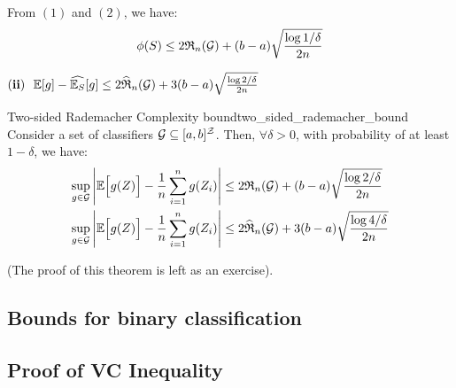 \begin{proof*}
    \noindent From $(1)$ and $(2)$, we have:
    \begin{align*}
        \phi(S) \le 2\mathfrak{R}_n(\mathcal{G}) + (b-a)\sqrt{
            \frac{\log 1/\delta}{2n}
        }
    \end{align*}

    \begin{subproof}{\newline ${\bf (ii)} \ \ \mathbb{E}[g] - \widehat{\mathbb{E}_S}[g] \le 2\widehat{\mathfrak{R}}_n(\mathcal{G}) + 3(b-a)\sqrt{\frac{\log2/\delta}{2n}}$}
        
    \end{subproof}
\end{proof*}

\begin{theorem}{Two-sided Rademacher Complexity bound}{two_sided_rademacher_bound}
    Consider a set of classifiers $\mathcal{G}\subseteq[a,b]^\mathcal{Z}$. Then, $\forall \delta>0$, with probability of at least $1-\delta$, we have:
    \begin{align*}
        \sup_{g\in\mathcal{G}}\Bigg| 
            \mathbb{E}\Big[  g(Z)  \Big] - \frac{1}{n}\sum_{i=1}^n g(Z_i)
         \Bigg| &\le 2 \mathfrak{R}_n(\mathcal{G}) + (b-a)\sqrt{
            \frac{\log 2/\delta}{2n}
        } \\
        \sup_{g\in\mathcal{G}}\Bigg| 
            \mathbb{E}\Big[  g(Z)  \Big] - \frac{1}{n}\sum_{i=1}^n g(Z_i)
         \Bigg| &\le 2 \widehat{\mathfrak{R}}_n(\mathcal{G}) + 3(b-a)\sqrt{
            \frac{\log 4/\delta}{2n}
        }
    \end{align*}
\end{theorem}

\begin{proof*}
    (The proof of this theorem is left as an exercise).
\end{proof*}


\subsection{Bounds for binary classification}




\subsection{Proof of VC Inequality}
\label{sec:proof_of_vc_inequality}

